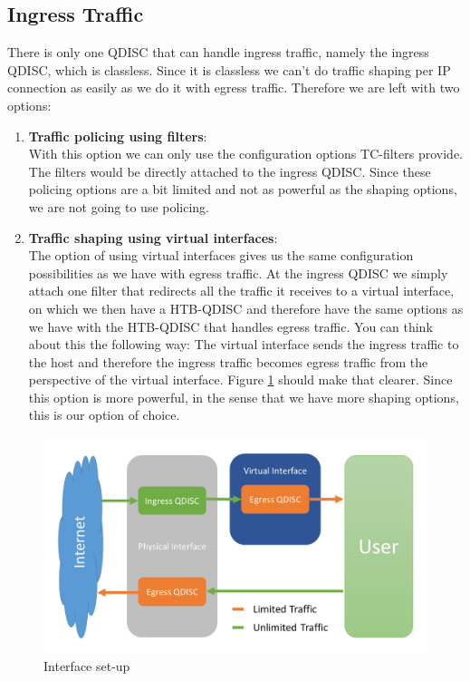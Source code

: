 \newpage
\subsection{Ingress Traffic} \label{Ingress Traffic}
There is only one \acs{QDISC} that can handle ingress traffic, namely the ingress \acs{QDISC}, which is classless. Since it is classless we can't do traffic shaping per \acs{IP} connection as easily as we do it with egress traffic. Therefore we are left with two options:
\begin{enumerate}
\item \textbf{Traffic policing using filters}:
\\With this option we can only use the configuration options \acs{TC}-filters provide. The filters would be directly attached to the ingress \acs{QDISC}. Since these policing options are a bit limited and not as powerful as the shaping options, we are not going to use policing.
\item \textbf{Traffic shaping using virtual interfaces}:
\\The option of using virtual interfaces gives us the same configuration possibilities as we have with egress traffic. At the ingress \acs{QDISC} we simply attach one filter that redirects all the traffic it receives to a virtual interface, on which we then have a \acs{HTB}-\acs{QDISC} and therefore have the same options as we have with the \acs{HTB}-\acs{QDISC} that handles egress traffic. You can think about this the following way: The virtual interface sends the ingress traffic to the host and therefore the ingress traffic becomes egress traffic from the perspective of the virtual interface. Figure \ref{Interface set-up} should make that clearer. Since this option is more powerful, in the sense that we have more shaping options, this is our option of choice.
\end{enumerate}

\begin{figure}[h]
	\centering
	\includegraphics[width=\textwidth]{img/Interface-Setup.png}
	\caption{Interface set-up}
	\label{Interface set-up}
\end{figure}


